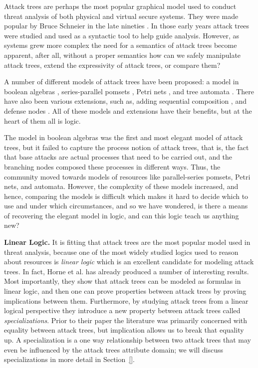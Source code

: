Attack trees are perhaps the most popular graphical model used to
conduct threat analysis of both physical and virtual secure
systems. They were made popular by Bruce Schneier in the late nineties
\cite{Schneier:1999}.  In those early years attack trees were studied
and used as a syntactic tool to help guide analysis.  However, as
systems grew more complex the need for a semantics of attack trees
become apparent, after all, without a proper semantics how can we
safely manipulate attack trees, extend the expressivity of attack
trees, or compare them?

A number of different models of attack trees have been proposed: a
model in boolean algebras
\cite{Kordy:2014,Kordy:2012,Pietre-Cambacedes:2010}, series-parallel
pomsets \cite{Mauw:2006}, Petri nets \cite{McDermott:2001}, and tree
automata \cite{Camtepe:2007}.  There have also been various
extensions, such as, adding sequential composition \cite{Jhawar:2015},
and defense nodes \cite{Kordy:2011,Kordy:2012}.  All of these models
and extensions have their benefits, but at the heart of them all is
logic.

The model in boolean algebras was the first and most elegant model of
attack trees, but it failed to capture the process notion of attack
trees, that is, the fact that base attacks are actual processes that
need to be carried out, and the branching nodes composed these
processes in different ways.  Thus, the community moved towards models
of resources like parallel-series pomsets, Petri nets, and automata.
However, the complexity of these models increased, and hence,
comparing the models is difficult which makes it hard to decide which
to use and under which circumstances, and so we have wondered, is
there a means of recovering the elegant model in logic, and can this
logic teach us anything new?

\textbf{Linear Logic.}  It is fitting that attack trees are the most
popular model used in threat analysis, because one of the most widely
studied logics used to reason about resources is \emph{linear logic}
which is an excellent candidate for modeling attack trees.  In fact,
Horne et al.\cite{horne2017semantics} has already produced a number of
interesting results.  Most importantly, they show that attack trees
can be modeled as formulas in linear logic, and then one can prove
properties between attack trees by proving implications between them.
Furthermore, by studying attack trees from a linear logical
perspective they introduce a new property between attack trees called
\emph{specializations}.  Prior to their paper the literature was
primarily concerned with equality between attack trees, but
implication allows us to break that equality up.  A specialization is
a one way relationship between two attack trees that may even be
influenced by the attack trees attribute domain; we will discuss
specializations in more detail in Section~\ref{}.

